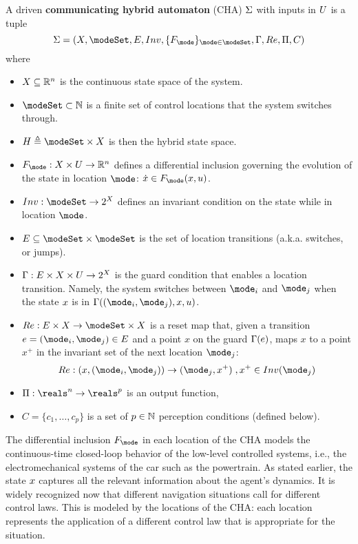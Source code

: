 \begin{defn}
	\label{def:CHA}
A driven \textbf{communicating hybrid automaton} (CHA) $\Sigma$ with inputs in $U$ 
is a tuple 
\[\Sys = (\stSet, \modeSet, E, Inv, \{F_\mode\}_{\mode \in \modeSet}, \guard, \reset, \funcOut, C)\]
where 
\begin{itemize}
	\item $X \subseteq \mathbb{R}^n$ is the continuous state space of the system.
	\item $\modeSet \subset \Ne$ is a finite set of control locations that the system switches through. 
	\item $\hsSet \triangleq \modeSet \times \stSet$ is then the hybrid state space.
	\item $F_\mode : \stSet \times \inpSet \rightarrow \Re^n$ defines a differential inclusion governing the evolution of the state in location $\mode$: $\dot{\stPt} \in F_\mode(\stPt,u)$. 
	\item $Inv : \modeSet \rightarrow 2^\stSet$ defines an invariant condition on the state while in location $\mode$.
	\item $E \subseteq \modeSet \times \modeSet$ is the set of location transitions (a.k.a. switches, or jumps).
	\item $\Gamma : E \times X \times U \rightarrow 2^X$ is the guard condition that enables a location transition. 
	Namely, the system switches between $\mode _i$ and $\mode _j$ when the state $x$ is in $\guard((\mode_i,\mode _j),x,u)$.
	\item $\reset : E \times \stSet \rightarrow \modeSet \times \stSet $ is a reset map that, given a transition $e = (\mode _i,\mode _j) \in E$ and a point $x$ on the guard $\Gamma(e)$, maps $x$ to a point $x^+$ in the invariant set of the next location $\mode_j$:
	\[\reset: (x,(\mode _i,\mode _j)) \rightarrow (\mode_j,x^+)\;, x^+ \in Inv(\mode_j)\] 
	\item $\funcOut: \reals^n \rightarrow \reals^p$ is an output function,
	\item $C = \{c_1,\ldots,c_p\}$ is a set of $p \in \mathbb{N}$ perception conditions (defined below).	
\end{itemize}
\end{defn}

The differential inclusion $F_\mode$ in each location of the CHA models the continuous-time closed-loop behavior of the low-level controlled systems, i.e., the electromechanical systems of the car such as the powertrain.
As stated earlier, the state $x$ captures all the relevant information about the agent's dynamics. 
It is widely recognized now that different navigation situations call for different control laws.
This is modeled by the locations of the CHA: each location represents the application of a different control law that is appropriate for the situation.

